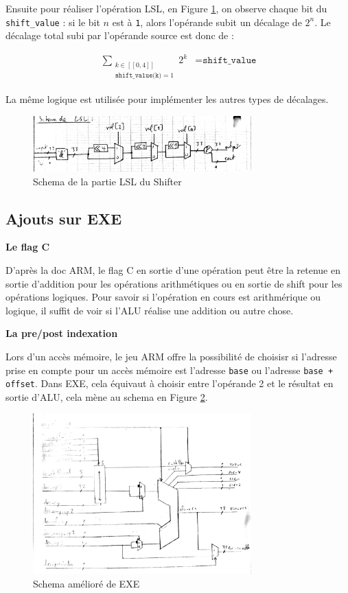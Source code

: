 \documentclass{article}
\begin{document}
Ensuite pour réaliser l'opération LSL, en Figure \ref{shifter_lsl},
on observe chaque bit du \texttt{shift\_value} :
si le bit $n$ est à \texttt{1}, alors l'opérande subit un décalage de $2^n$.
Le décalage total subi par l'opérande source est donc de :

\begin{eqnarray*}
  \sum_{\substack{k \in [[0, 4]] \\ \texttt{shift\_value(k)} = 1}} 2^k &= \texttt{shift\_value}
\end{eqnarray*}

La même logique est utilisée pour implémenter les autres types de décalages.

\begin{figure}[H]
\includegraphics[width=0.75\textwidth]{pics/shifter_lsl.png}
\centering
\caption{Schema de la partie LSL du Shifter}
\label{shifter_lsl}
\end{figure}



\subsection{Ajouts sur EXE}

\textbf{Le flag C}

D'après la doc ARM, le flag C en sortie d'une opération peut être la retenue en sortie d'addition
pour les opérations arithmétiques ou en sortie de shift pour les opérations logiques.
Pour savoir si l'opération en cours est arithmérique ou logique, il suffit de voir si
l'ALU réalise une addition ou autre chose.

\textbf{La pre/post indexation}

Lors d'un accès mémoire, le jeu ARM offre la possibilité de choisisr si l'adresse prise en compte
pour un accès mémoire est l'adresse \texttt{base} ou l'adresse \texttt{base + offset}.
Dans EXE, cela équivaut à choisir entre l'opérande 2 et le résultat en sortie d'ALU,
cela mène au schema en Figure \ref{exe2}.

\begin{figure}[H]
\includegraphics[width=0.75\textwidth]{pics/exe2.png}
\centering
\caption{Schema amélioré de EXE}
\label{exe2}
\end{figure}
\end{document}

